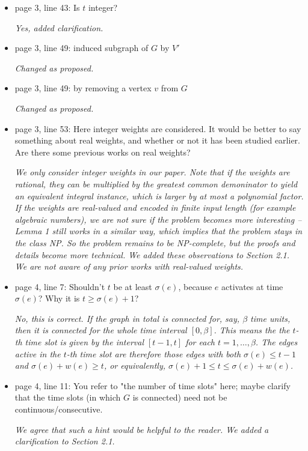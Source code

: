 \documentclass[11pt,a4paper]{article}
\begin{document}
\begin{itemize}
\item page 3, line 43: Is $t$ integer?

\textit{Yes, added clarification.}

\item page 3, line 49: induced subgraph of $G$ by $V'$

\textit{Changed as proposed.}

\item page 3, line 49: by removing a vertex $v$ from $G$

\textit{Changed as proposed.}

\item page 3, line 53: Here integer weights are considered. It would be better to say something about real weights, and whether or not it has been studied earlier. Are there some previous works on real weights?

\textit{We only consider integer weights in our paper. Note that if the weights are rational, they can be multiplied by the greatest common demoninator to yield an equivalent integral instance, which is larger by at most a polynomial factor. If the weights are real-valued and encoded in finite input length (for example algebraic numbers), we are not sure if the problem becomes more interesting -- Lemma 1 still works in a similar way, which implies that the problem stays in the class NP. So the problem remains to be NP-complete, but the proofs and details become more technical. We added these observations to Section 2.1. We are not aware of any prior works with real-valued weights.}

\item page 4, line 7: Shouldn't $t$ be at least $\sigma(e)$, because $e$ activates at time $\sigma(e)$? Why it is $t \geq \sigma(e)+1$?

\textit{No, this is correct. If the graph in total is connected for, say, $\beta$ time units, then it is connected for the whole time interval $[0, \beta]$. This means the the $t$-th time slot is given by the interval $[t-1,t]$ for each $t=1,\dots,\beta$. The edges active in the $t$-th time slot are therefore those edges with both $\sigma(e) \leq t-1$ and $\sigma(e) + w(e) \geq t$, or equivalently, $\sigma(e) + 1 \leq t \leq \sigma(e) + w(e)$.}

\item page 4, line 11: You refer to "the number of time slots" here; maybe clarify that the time slots (in which $G$ is connected) need not be continuous/consecutive.

\textit{We agree that such a hint would be helpful to the reader. We added a clarification to Section 2.1.}


\end{itemize}
\end{document}
